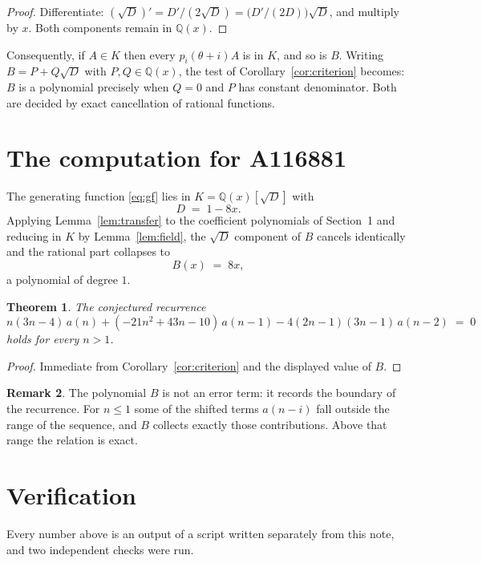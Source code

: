 \documentclass[11pt,a4paper]{article}
\theoremstyle{plain}
\newtheorem{theorem}{Theorem}
\theoremstyle{definition}
\newtheorem{remark}[theorem]{Remark}
\begin{document}
\begin{proof}
Differentiate: $(\sqrt{D})'=D'/(2\sqrt{D})=\bigl(D'/(2D)\bigr)\sqrt{D}$, and multiply by
$x$. Both components remain in $\mathbb{Q}(x)$.
\end{proof}

Consequently, if $A\in K$ then every $p_{i}(\theta+i)A$ is in $K$, and so is $B$. Writing
$B=P+Q\sqrt{D}$ with $P,Q\in\mathbb{Q}(x)$, the test of Corollary~\ref{cor:criterion}
becomes: $B$ is a polynomial precisely when $Q=0$ and $P$ has constant denominator. Both
are decided by exact cancellation of rational functions.

\section{The computation for A116881}

The generating function \eqref{eq:gf} lies in $K=\mathbb{Q}(x)[\sqrt{D}]$ with
\[
D \;=\; 1 - 8 x .
\]
Applying Lemma~\ref{lem:transfer} to the coefficient polynomials of Section~1 and reducing
in $K$ by Lemma~\ref{lem:field}, the $\sqrt{D}$ component of $B$ cancels identically and
the rational part collapses to
\[
B(x)\;=\;8 x ,
\]
a polynomial of degree $1$.

\begin{theorem}
The conjectured recurrence
\[
n \left(3 n - 4\right)\,a(n) + (- 21 n^{2} + 43 n - 10)\,a(n-1) -  4 \left(2 n - 1\right) \left(3 n - 1\right)\,a(n-2) \;=\;0
\]
holds for every $n>1$.
\end{theorem}

\begin{proof}
Immediate from Corollary~\ref{cor:criterion} and the displayed value of $B$.
\end{proof}

\begin{remark}
The polynomial $B$ is not an error term: it records the boundary of the recurrence. For
$n\le1$ some of the shifted terms $a(n-i)$ fall outside the range of the sequence,
and $B$ collects exactly those contributions. Above that range the relation is exact.
\end{remark}

\section{Verification}

Every number above is an output of a script written separately from this note, and two
independent checks were run.
\end{document}
